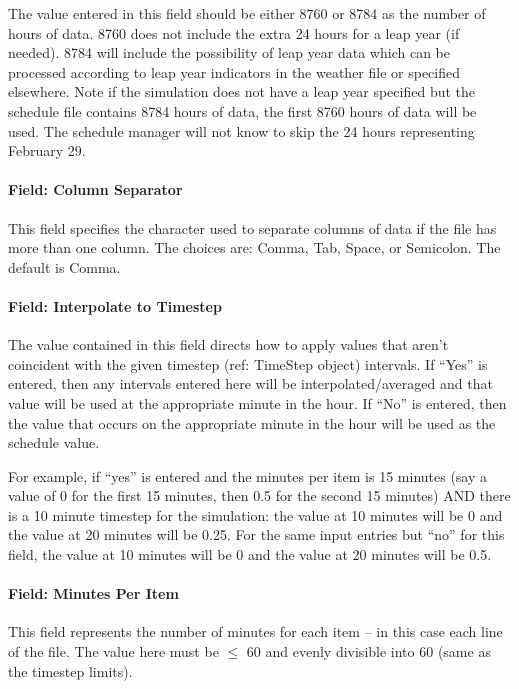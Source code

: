 The value entered in this field should be either 8760 or 8784 as the number of hours of data. 8760 does not include the extra 24 hours for a leap year (if needed). 8784 will include the possibility of leap year data which can be processed according to leap year indicators in the weather file or specified elsewhere. Note if the simulation does not have a leap year specified but the schedule file contains 8784 hours of data, the first 8760 hours of data will be used. The schedule manager will not know to skip the 24 hours representing February 29.

\paragraph{Field: Column Separator}\label{field-column-separator-001}

This field specifies the character used to separate columns of data if the file has more than one column. The choices are: Comma, Tab, Space, or Semicolon. The default is Comma.

\paragraph{Field: Interpolate to Timestep}\label{field-interpolate-to-timestep-2}

The value contained in this field directs how to apply values that aren't coincident with the given timestep (ref: TimeStep object) intervals. If ``Yes'' is entered, then any intervals entered here will be interpolated/averaged and that value will be used at the appropriate minute in the hour. If ``No'' is entered, then the value that occurs on the appropriate minute in the hour will be used as the schedule value.

For example, if ``yes'' is entered and the minutes per item is 15 minutes (say a value of 0 for the first 15 minutes, then 0.5 for the second 15 minutes) AND there is a 10 minute timestep for the simulation: the value at 10 minutes will be 0 and the value at 20 minutes will be 0.25. For the same input entries but ``no'' for this field, the value at 10 minutes will be 0 and the value at 20 minutes will be 0.5.

\paragraph{Field: Minutes Per Item}\label{field-minutes-per-item-1}

This field represents the number of minutes for each item -- in this case each line of the file. The value here must be \(\le\) 60 and evenly divisible into 60 (same as the timestep limits).

